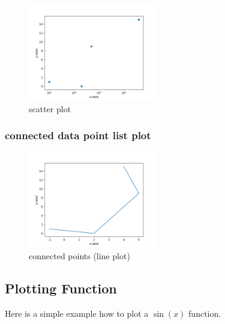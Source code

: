 \documentclass[10pt,a4paper]{article}
\begin{document}
\begin{figure}[h]\centering \caption{scatter plot}
\includegraphics[width=0.5\textwidth]{plot_list_data_3.png}
\end{figure}

\subsubsection{connected data point list plot}

\begin{figure}[h]\centering \caption{connected points (line plot)}
\includegraphics[width=0.5\textwidth]{plot_list_data_4.png}
\end{figure}

\subsection{Plotting Function}
Here is a simple example how to plot a $\sin(x)$ function.

\end{document}
